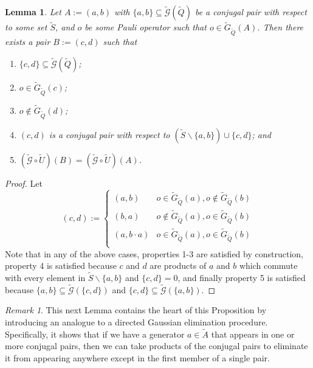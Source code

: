 \documentclass{amsbook}
\theoremstyle{plain}
\newtheorem{lemma}{Lemma}
\theoremstyle{definition}
\theoremstyle{remark}
\newtheorem{remark}{Remark}
\newcommand{\set}{\tilde}
\newcommand{\genfun}{\tilde{\mathcal{G}}}
\newcommand{\paren}[1]{\left(#1\right)}
\begin{document}
\begin{lemma}
\label{single-pair-rearrangement}
Let $A:=(a,b)$ with $\{a,b\}\subseteq\genfun(\set Q)$ be a conjugal pair with respect to some set $\set S$, and $o$ be some Pauli operator such that $o\in\set G_{\set Q}(A)$.  Then there exists a pair $B:=(c,d)$ such that
\begin{enumerate}
\item $\{c,d\}\subseteq\genfun(\set Q)$;
\item $o\in \set G_{\set Q}(c)$;
\item $o\notin \set G_{\set Q}(d)$;
\item $(c,d)$ is a conjugal pair with respect to $\paren{\set S\backslash \{a,b\}}\cup\{c,d\}$; and
\item $(\genfun\circ\set U)(B) = (\genfun\circ\set U)(A)$.
\end{enumerate}
\end{lemma}

\begin{proof}
Let
$$
(c,d):=
\begin{cases}
\paren{a,b} & o\in \set G_{\set Q}(a), o\notin \set G_{\set Q}(b) \\
\paren{b,a} &  o\notin \set G_{\set Q}(a), o\in \set G_{\set Q}(b) \\
\paren{a,b\cdot a} & o\in \set G_{\set Q}(a), o\in \set G_{\set Q}(b) \\
\end{cases}
$$
Note that in any of the above cases, properties 1-3 are satisfied by construction, property 4 is satisfied because $c$ and $d$ are products of $a$ and $b$ which commute with every element in $\set S\backslash \{a,b\}$ and $\{c,d\}=0$, and finally property 5 is satisfied because $\{a,b\}\subseteq \genfun\paren{\{c,d\}}$ and $\{c,d\}\subseteq \genfun\paren{\{a,b\}}$.
\end{proof}
\begin{remark}
This next Lemma contains the heart of this Proposition by introducing an analogue to a directed Gaussian elimination procedure.  Specifically, it shows that if we have a generator $a\in\set A$ that appears in one or more conjugal pairs, then we can take products of the conjugal pairs to eliminate it from appearing anywhere except in the first member of a single pair.
\end{remark}
\end{document}
